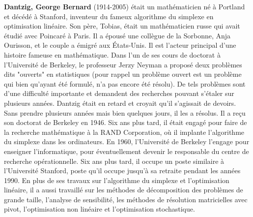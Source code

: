 \textbf{Dantzig, George Bernard} (1914-2005) était un mathématicien né à Portland et décédé à Stanford, inventeur du fameux algorithme du simplexe en optimisation linéaire. Son père, Tobias, était un mathématicien russe qui avait étudié avec Poincaré à Paris. Il a épousé une collègue de la Sorbonne, Anja Ourisson, et le couple a émigré aux États-Unis. Il est l'acteur principal d'une histoire fameuse en mathématique. Dans l'un de ses cours de doctorat à l'Université de Berkeley, le professeur Jerzy Neyman a proposé deux problèmes dits "ouverts" en statistiques (pour rappel un problème ouvert est un problème qui bien qu'ayant été formulé, n'a pas encore été résolu). De tels problèmes sont d'une difficulté importante et demandent des recherches pouvant s'étaler sur plusieurs années. Dantzig était en retard et croyait qu'il s'agissait de devoirs. Sans prendre plusieurs années mais bien quelques jours, il les a résolus. Il a reçu son doctorat de Berkeley en 1946. Six ans plus tard, il était engagé pour faire de la recherche mathématique à la RAND Corporation, où il implante l'algorithme du simplexe dans les ordinateurs. En 1960, l'Université de Berkeley l'engage pour enseigner l'informatique, pour éventuellement devenir le responsable du centre de recherche opérationnelle. Six ans plus tard, il occupe un poste similaire à l'Université Stanford, poste qu'il occupe jusqu'à sa retraite pendant les années 1990. En plus de ses travaux sur l'algorithme du simplexe et l'optimisation linéaire, il a aussi travaillé sur les méthodes de décomposition des problèmes de grande taille, l'analyse de sensibilité, les méthodes de résolution matricielles avec pivot, l'optimisation non linéaire et l'optimisation stochastique.

